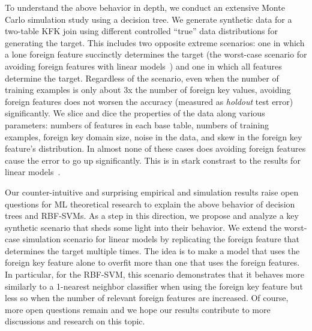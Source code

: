 \documentclass[sigconf]{acmart}
\begin{document}
To understand the above behavior in depth, we conduct an extensive Monte Carlo simulation study using a decision tree. We generate synthetic data for a two-table KFK join using 
different controlled ``true'' data distributions for generating the target. This includes two opposite extreme scenarios: one in which a lone foreign feature succinctly 
determines the target (the worst-case scenario for avoiding foreign features with linear models~\cite{hamlet}) and one in which all features determine the target. 
Regardless of the scenario, even when the number of training examples is only about $3$x the number of foreign key values, avoiding foreign 
features does not worsen the accuracy (measured as \textit{holdout} test error) significantly. We slice and dice the properties of the data along various parameters: numbers of features 
in each base table, numbers of training examples, foreign key domain size, noise in the data, and skew in the foreign key feature's distribution. In almost none of these cases 
does avoiding foreign features cause the error to go up significantly. This is in stark constrast to the results for linear models~\cite{hamlet}.

Our counter-intuitive and surprising empirical and simulation results raise  open questions for ML theoretical research to explain the above behavior of 
decision trees and RBF-SVMs. As a step in this direction, we propose and analyze a key synthetic scenario that sheds some light into their behavior. 
We extend the worst-case simulation scenario for linear models by replicating the foreign feature that determines the target multiple times. The idea is to make a model that uses 
the foreign key feature alone to overfit more than one that uses the foreign features. In particular, for the RBF-SVM, this scenario demonstrates that it behaves 
more similarly to a 1-nearest neighbor classifier when using the foreign key feature but less so when the number of relevant foreign features are increased.
Of course, more open questions remain and we hope our results contribute to more discussions and research on this topic.
\end{document}

